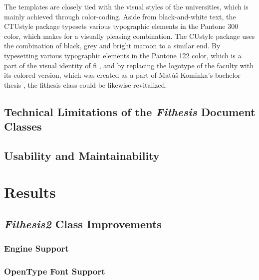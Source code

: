 \documentclass{article}
\begin{document}
  The templates are closely tied with the visual styles of the universities, which is mainly achieved through color-coding. Aside from black-and-white text, the CTUstyle package typesets various typographic elements in the  Pantone 300 color, which makes for a visually pleasing combination. The CUstyle package uses the combination of black, \textcolor{cugray}{grey} and  bright maroon to a similar end. By typesetting various typographic elements in the  Pantone 122 color, which is a part of the visual identity of \gls{fi} \cite{muvis,filogo}, and by replacing the logotype of the faculty with its colored version, which was created as a part of Matúš Kominka's bachelor thesis \cite{Kominka08}, the fithesis class could be likewise revitalized.


  \subsection{Technical Limitations of the \emph{Fithesis} Document Classes}
  \subsection{Usability and Maintainability}
  \section{Results}
  \subsection{\emph{Fithesis2} Class Improvements}
  \subsubsection{ Engine Support}
  \subsubsection{OpenType Font Support}
\end{document}
